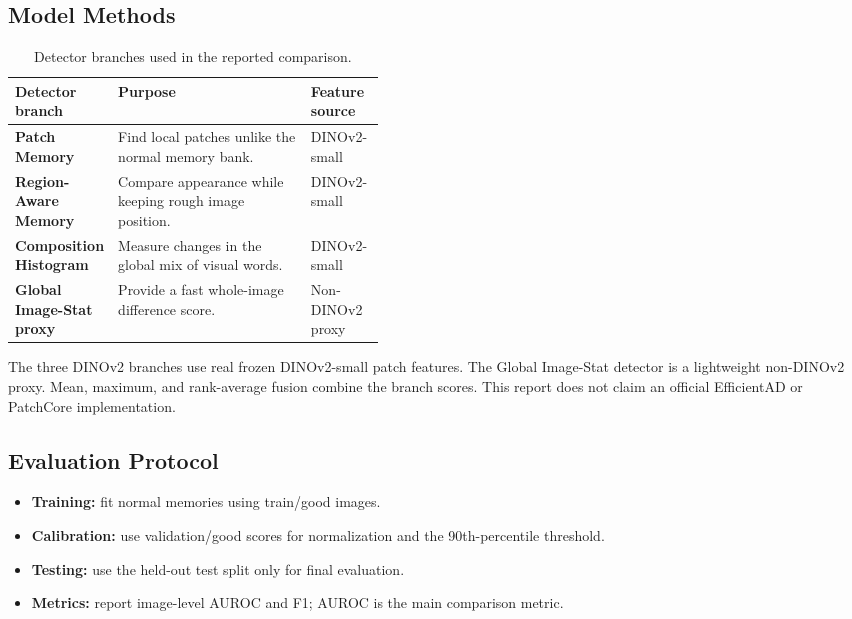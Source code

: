 \documentclass[10pt]{article}
\begin{document}
\subsection{Model Methods}
\begin{table}[H]
\centering
\footnotesize
\begin{tabularx}{\linewidth}{>{\bfseries}p{0.23\linewidth}X p{0.20\linewidth}}
\toprule
Detector branch & Purpose & Feature source\\
\midrule
Patch Memory & Find local patches unlike the normal memory bank. & DINOv2-small\\
Region-Aware Memory & Compare appearance while keeping rough image position. & DINOv2-small\\
Composition Histogram & Measure changes in the global mix of visual words. & DINOv2-small\\
Global Image-Stat proxy & Provide a fast whole-image difference score. & Non-DINOv2 proxy\\
\bottomrule
\end{tabularx}
\caption{Detector branches used in the reported comparison.}
\end{table}

The three DINOv2 branches use real frozen DINOv2-small patch features. The Global
Image-Stat detector is a lightweight non-DINOv2 proxy. Mean, maximum, and rank-average
fusion combine the branch scores. This report does not claim an official EfficientAD
or PatchCore implementation.

\subsection{Evaluation Protocol}
\begin{itemize}
\item \textbf{Training:} fit normal memories using train/good images.
\item \textbf{Calibration:} use validation/good scores for normalization and the 90th-percentile threshold.
\item \textbf{Testing:} use the held-out test split only for final evaluation.
\item \textbf{Metrics:} report image-level AUROC and F1; AUROC is the main comparison metric.
\end{itemize}

\newpage
\end{document}
